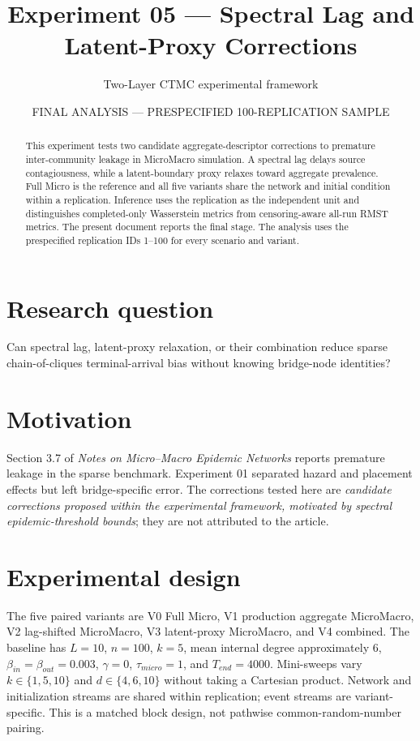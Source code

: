 \documentclass[11pt]{article}
\title{Experiment 05 --- Spectral Lag and Latent-Proxy Corrections}
\author{Two-Layer CTMC experimental framework}
\date{FINAL ANALYSIS --- PRESPECIFIED 100-REPLICATION SAMPLE}
\begin{document}
\maketitle
\begin{center}\end{center}

\begin{abstract}
This experiment tests two candidate aggregate-descriptor corrections to premature
inter-community leakage in MicroMacro simulation.  A spectral lag delays source
contagiousness, while a latent-boundary proxy relaxes toward aggregate prevalence.
Full Micro is the reference and all five variants share the network and initial
condition within a replication.  Inference uses the replication as the independent
unit and distinguishes completed-only Wasserstein metrics from censoring-aware
all-run RMST metrics.  The present document reports the final stage.
The analysis uses the prespecified replication IDs 1--100 for every scenario and variant.
\end{abstract}

\section{Research question}
Can spectral lag, latent-proxy relaxation, or their combination reduce sparse
chain-of-cliques terminal-arrival bias without knowing bridge-node identities?

\section{Motivation}
Section 3.7 of \emph{Notes on Micro--Macro Epidemic Networks} reports premature
leakage in the sparse benchmark. Experiment 01 separated hazard and placement
effects but left bridge-specific error. The corrections tested here are
\emph{candidate corrections proposed within the experimental framework, motivated
by spectral epidemic-threshold bounds}; they are not attributed to the article.

\section{Experimental design}
The five paired variants are V0 Full Micro, V1 production aggregate MicroMacro,
V2 lag-shifted MicroMacro, V3 latent-proxy MicroMacro, and V4 combined.
The baseline has $L=10$, $n=100$, $k=5$, mean internal degree approximately 6,
$\beta_{in}=\beta_{out}=0.003$, $\gamma=0$, $\tau_{micro}=1$, and
$T_{end}=4000$. Mini-sweeps vary $k\in\{1,5,10\}$ and
$d\in\{4,6,10\}$ without taking a Cartesian product. Network and initialization
streams are shared within replication; event streams are variant-specific. This is
a matched block design, not pathwise common-random-number pairing.
\end{document}
